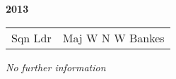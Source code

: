 \begin{center}
  \Huge
  \textbf{2013}
\end{center}

\begin{center}
  \small
  \begin{tabular}{rl}
    Sqn Ldr & Maj W N W Bankes \\
  \end{tabular}
\end{center}

\begin{center}
  \textit{No further information}
\end{center}

\vspace{50mm}

\pagebreak
